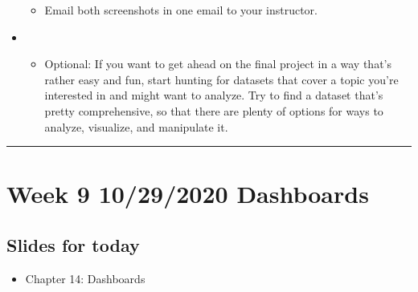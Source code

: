 \documentclass[letterpaper,10pt,english]{sphinxmanual}
\begin{document}
\begin{itemize}
\begin{itemize}
\item {} 
Email both screenshots in one email to your instructor.

\end{itemize}

\item {} 
\begin{itemize}
\item {} 
Optional: If you want to get ahead on the final project in a way that’s rather easy and fun, start hunting for datasets that cover a topic you’re interested in and might want to analyze.  Try to find a dataset that’s pretty comprehensive, so that there are plenty of options for ways to analyze, visualize, and manipulate it.

\end{itemize}

\end{itemize}


\bigskip\hrule\bigskip



\section{Week 9 \sphinxhyphen{} 10/29/2020 \sphinxhyphen{} Dashboards}
\label{\detokenize{course-schedule:week-9-10-29-2020-dashboards}}

\subsection{Slides for today}
\label{\detokenize{course-schedule:id15}}\begin{itemize}
\item {} 
Chapter 14: Dashboards

\end{itemize}
\end{document}
